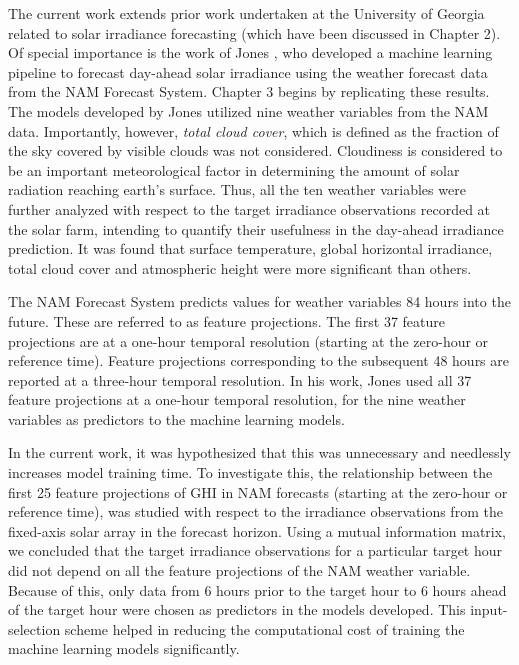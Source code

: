 \restoregeometry
\par The current work extends prior work undertaken at the University of Georgia related to solar irradiance forecasting (which have been discussed in Chapter 2). Of special importance is the work of Jones \cite{thesis_zach}, who developed a machine learning pipeline to forecast day-ahead solar irradiance using the weather forecast data from the NAM Forecast System. Chapter 3 begins by replicating these results. The models developed by Jones \cite{thesis_zach} utilized nine weather variables from the NAM data. Importantly, however, \textit{total cloud cover}, which is defined as the fraction of the sky covered by visible clouds was not considered. Cloudiness is considered to be an important meteorological factor in determining the amount of solar radiation reaching earth's surface. Thus, all the ten weather variables were further analyzed with respect to the target irradiance observations recorded at the solar farm, intending to quantify their usefulness in the day-ahead irradiance prediction. It was found that surface temperature, global horizontal irradiance, total cloud cover and atmospheric height were more significant than others.

\par The NAM Forecast System predicts values for weather variables 84 hours into the future. These are referred to as feature projections. The first 37 feature projections are at a one-hour temporal resolution (starting at the zero-hour or reference time). Feature projections corresponding to the subsequent 48 hours are reported at a three-hour temporal resolution. In his work, Jones \cite{thesis_zach} used all 37 feature projections at a one-hour temporal resolution, for the nine weather variables as predictors to the machine learning models.

\par In the current work, it was hypothesized that this was unnecessary and needlessly increases model training time. To investigate this, the relationship between the first 25 feature projections of GHI in NAM forecasts (starting at the zero-hour or reference time), was studied with respect to the irradiance observations from the fixed-axis solar array in the forecast horizon. Using a mutual information matrix, we concluded that the target irradiance observations for a particular target hour did not depend on all the feature projections of the NAM weather variable. Because of this, only data from 6 hours prior to the target hour to 6 hours ahead of the target hour were chosen as predictors in the models developed. This input-selection scheme helped in reducing the computational cost of training the machine learning models significantly. 

